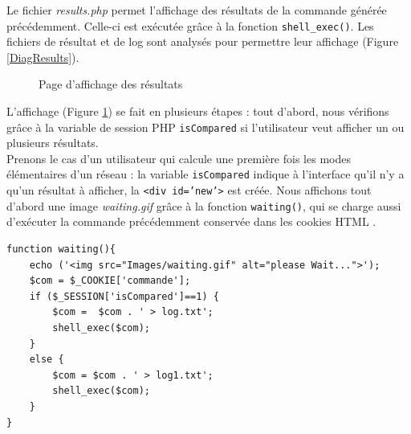 Le fichier \emph{results.php} permet l'affichage des résultats de la commande générée précédemment. Celle-ci est exécutée grâce à la fonction \texttt{shell\_exec()}. Les fichiers de résultat et de log sont analysés pour permettre leur affichage (Figure \ref{DiagResults}).\\

\begin{figure}[!ht]
	\begin{center}
		\caption{Page d'affichage des résultats}
  		\label{Results}
  	\end{center}	
\end{figure}

L'affichage (Figure \ref{Results}) se fait en plusieurs étapes : tout d'abord, nous vérifions grâce à la variable de session PHP \texttt{isCompared} si l'utilisateur veut afficher un ou plusieurs résultats.\\

Prenons le cas d'un utilisateur qui calcule une première fois les modes élémentaires d'un réseau : la variable \texttt{isCompared} indique à l'interface qu'il n'y a qu'un résultat à afficher, la \texttt{<div id='new'>} est créée. Nous affichons tout d'abord une image \emph{waiting.gif} grâce à la fonction \texttt{waiting()}, qui se charge aussi d'exécuter la commande précédemment conservée dans les cookies HTML .\\

\begin{DDbox}{\linewidth}
\begin{lstlisting}
function waiting(){
	echo ('<img src="Images/waiting.gif" alt="please Wait...">');
	$com = $_COOKIE['commande'];
	if ($_SESSION['isCompared']==1) {
		$com =  $com . ' > log.txt';
		shell_exec($com);
	}
	else {
		$com = $com . ' > log1.txt';
		shell_exec($com);
	}
}
\end{lstlisting}
\end{DDbox}\\

